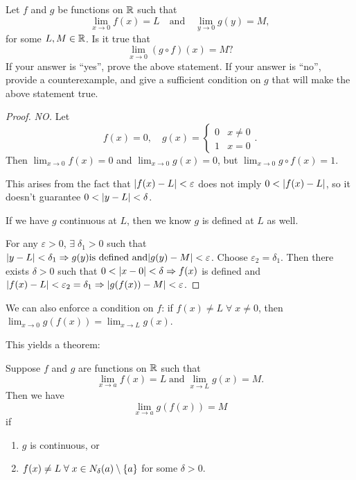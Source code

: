 \documentclass[12pt]{article}
\begin{document}
\begin{problem}
    Let $f$ and $g$ be functions on $\mathbb{R}$ such that \[
        \lim_{x \to 0} f(x) = L \quad\text{and}\quad \lim_{y \to 0} g(y) = M,
    \] for some $L, M \in \mathbb{R}$.
    Is it true that \[
        \lim_{x \to 0} (g \circ f)(x) = M?
    \] If your answer is ``yes'', prove the above statement.
    If your answer is ``no'', provide a counterexample, and give a sufficient condition on $g$ that will make the above statement true.
\end{problem}
\begin{proof}
    \emph{NO.}
    Let \[
        f(x) = 0,\quad g(x) = \begin{cases}
            0 & x \neq 0 \\
            1 & x = 0
        \end{cases}.
    \]
    Then $\lim_{x \to 0} f(x) = 0$ and $\lim_{x \to 0} g(x) = 0$, but $\lim_{x \to 0} g \circ f (x) = 1$.
    
    This arises from the fact that $\abs{f(x) - L} < \varepsilon$ does not imply $0 < \abs{f(x) - L}$, so it doesn't guarantee $0 < \abs{y - L} < \delta$.
    
    If we have $g$ continuous at $L$, then we know $g$ is defined at $L$ as well.
    
    For any $\varepsilon > 0$, $\exists\; \delta_{1} > 0$ such that $\abs{y - L} < \delta_{1} \implies g(y) \textrm{is defined and} \abs{g(y) - M} < \varepsilon$.
    Choose $\varepsilon_{2} = \delta_{1}$.
    Then there exists $\delta > 0$ such that $0 < \abs{x - 0} < \delta \implies f(x)$ is defined and $\abs{f(x) - L} < \varepsilon_{2} = \delta_{1} \implies \abs{g(f(x)) - M} < \varepsilon$.
\end{proof}
\begin{rem}
    We can also enforce a condition on $f$: if $f(x) \neq L \;\forall\; x \neq 0$, then $\lim_{x \to 0} g(f(x)) = \lim_{x \to L} g(x)$.
\end{rem}
This yields a theorem:
\begin{thm} \label{thm:limit:composition}
    Suppose $f$ and $g$ are functions on $\mathbb{R}$ such that \[
        \lim_{x \to a} f(x) = L \;\textrm{and}\; \lim_{x \to L} g(x) = M.
    \] Then we have \[
        \lim_{x \to a} g(f(x)) = M
    \] if
    \begin{enumerate}[label=(\alph*)]
        \item $g$ is continuous, or
        \item $f(x) \neq L \;\forall\; x \in N_{\delta}(a) \setminus \set{a}$ for some $\delta > 0$.
    \end{enumerate}
\end{thm}
\end{document}
